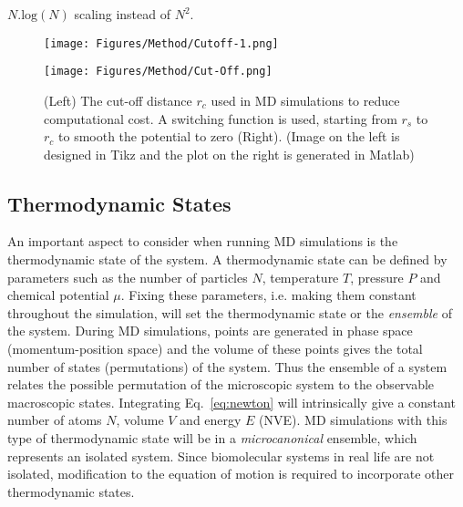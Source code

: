 $N.\text{log}(N)$ scaling instead of $N^2$.
\begin{figure}[t!]
\centering
\begin{minipage}{0.4\textwidth}
\centering
\texttt{[image: Figures/Method/Cutoff-1.png]}
\end{minipage}
\begin{minipage}{0.5\textwidth}
\centering
\texttt{[image: Figures/Method/Cut-Off.png]}
\end{minipage}
\caption{(Left) The cut-off distance $r_{c}$ used in MD simulations to reduce 
computational cost. A switching function is used, starting from $r_{s}$ to $r_{c}$ 
to smooth the potential to zero (Right). (Image on the left is designed in Tikz 
and the plot on the right is generated in Matlab)}
\label{method:cutoff}
\end{figure}

\subsection{Thermodynamic States}
An important aspect to consider when running MD simulations is the thermodynamic state of the 
system. A thermodynamic state can be defined by parameters such as the number of particles $N$, 
temperature $T$, pressure $P$ and chemical potential $\mu$. Fixing these parameters, i.e. making 
them constant throughout the simulation, will set the thermodynamic state or the \textit{ensemble} 
of the system. During MD simulations, points are generated in phase space (momentum-position space) 
and the volume of these points gives the total number of states (permutations) of the system. 
Thus the ensemble of a system relates the possible permutation of the microscopic system to the 
observable macroscopic states. Integrating Eq.~\eqref{eq:newton} will intrinsically give a constant 
number of atoms $N$, volume $V$ and energy $E$ (NVE). MD simulations with this type of thermodynamic 
state will be in a {\it microcanonical} ensemble, which represents an isolated system. Since 
biomolecular systems in real life are not isolated, modification to the equation of motion is 
required to incorporate other thermodynamic states.

